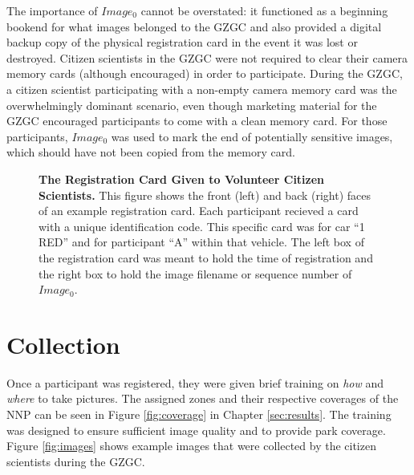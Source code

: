 The importance of $Image_0$ cannot be overstated: it functioned as a beginning bookend for what images belonged to the GZGC and also provided a digital backup copy of the physical registration card in the event it was lost or destroyed.  Citizen scientists in the GZGC were not required to clear their camera memory cards (although encouraged) in order to participate.  During the GZGC, a citizen scientist participating with a non-empty camera memory card was the overwhelmingly dominant scenario, even though marketing material for the GZGC encouraged participants to come with a clean memory card.  For those participants, $Image_0$ was used to mark the end of potentially sensitive images, which should have not been copied from the memory card.

\begin{figure}[t]%
    \centering
        \caption[The Registration Card Given to Volunteer Citizen Scientists]{\textbf{The Registration Card Given to Volunteer Citizen Scientists.}  This figure shows the front (left) and back (right) faces of an example registration card.  Each participant recieved a card with a unique identification code.  This specific card was for car ``1 RED'' and for participant ``A'' within that vehicle.  The left box of the registration card was meant to hold the time of registration and the right box to hold the image filename or sequence number of $Image_0$.}
        \label{fig:card}
\end{figure}

\section{Collection}
Once a participant was registered, they were given brief training on \textit{how} and \textit{where} to take pictures.  The assigned zones and their respective coverages of the NNP can be seen in Figure \ref{fig:coverage} in Chapter \ref{sec:results}. The training was designed to ensure sufficient image quality and to provide park coverage.  Figure \ref{fig:images} shows example images that were collected by the citizen scientists during the GZGC.

